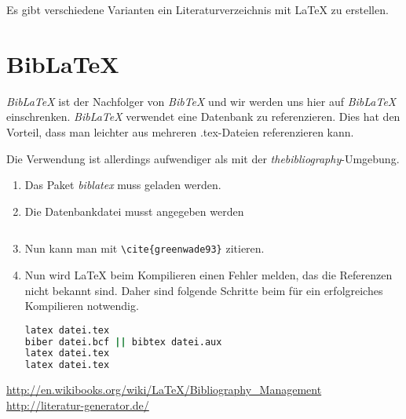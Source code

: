 \documentclass[a4paper]{article}
\begin{document}
Es gibt verschiedene Varianten ein Literaturverzeichnis mit \LaTeX{} zu
erstellen.



\tableofcontents

\section{BibLaTeX}
\emph{BibLaTeX} ist der Nachfolger von \emph{BibTeX} und wir werden uns hier auf
\emph{BibLaTeX} einschrenken. \emph{BibLaTeX} verwendet eine Datenbank zu
referenzieren. Dies hat den Vorteil, dass man leichter aus mehreren .tex-Dateien
referenzieren kann.


Die Verwendung ist allerdings aufwendiger als mit der
\emph{thebibliography}-Umgebung.
\begin{enumerate}
	\item Das Paket \emph{biblatex} muss geladen werden.
	\item Die Datenbankdatei musst angegeben werden
		\begin{lstlisting}

		\end{lstlisting}
	\item Nun kann man mit \verb+\cite{greenwade93}+ zitieren.
	\item Nun wird \LaTeX{} beim Kompilieren einen Fehler melden, das die Referenzen nicht bekannt sind. Daher sind folgende Schritte beim für ein erfolgreiches Kompilieren notwendig.
		\begin{lstlisting}[language=sh, morekeywords={latex,biber}]
latex datei.tex
biber datei.bcf || bibtex datei.aux
latex datei.tex
latex datei.tex
		\end{lstlisting}
\end{enumerate}
\cite{greenwade93}

\printbibliography

\url{http://en.wikibooks.org/wiki/LaTeX/Bibliography_Management}
\url{http://literatur-generator.de/}
\end{document}

